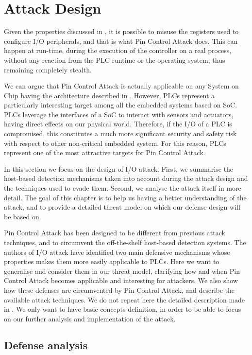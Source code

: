 \section{Attack Design}

Given the properties discussed in , it is possible to misuse the registers used to configure I/O peripherals,
and that is what Pin Control Attack does. This can happen at run-time, during the execution of the controller on a real process,
without any reaction from the PLC runtime or the operating system, thus remaining completely stealth.

We can argue that Pin Control Attack is actually applicable on any System on Chip having the
architecture described in . However, PLCs represent a particularly interesting target among all the embedded systems based on SoC.
PLCs leverage the interfaces of a SoC to interact with sensors and actuators, having direct effects on our physical world.
Therefore, if the I/O of a PLC is compromised, this constitutes a much more significant security and safety risk with respect to other
non-critical embedded system. For this reason, PLCs represent one of the most attractive targets for Pin Control Attack.

In this section we focus on the design of I/O attack. First, we summarise the host-based detection mechanisms taken into account
during the attack design and the techniques used to evade them. Second, we analyse the attack itself in more detail.
The goal of this chapter is to help us having a better understanding of the attack, and to provide a detailed threat model on which our defense design will be based on.

Pin Control Attack has been designed to be different from previous attack techniques, and to circumvent the off-the-shelf host-based detection systems.
The authors of I/O attack have identified two main defensive mechanisms whose properties makes them more easily applicable to PLCs.
Here we want to generalise and consider them in our threat model, clarifying how and when Pin Control Attack becomes applicable and interesting for attackers.
We also show how these defenses are circumvented by Pin Control Attack, and describe the available attack techniques.
We do not repeat here the detailed description made in \cite{ghostplc}. We only want to have basic concepts definition,
in order to be able to focus on our further analysis and implementation of the attack.


\subsection{Defense analysis}
\label{sec:def_analysis}

